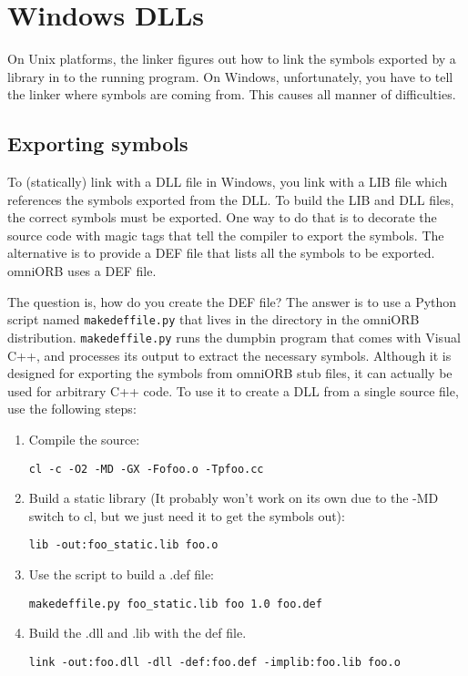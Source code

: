 \documentclass[11pt,twoside,a4paper]{book}
\newcommand{\cmdline}[1]{\texttt{#1}}
\newcommand{\file}{\begingroup \urlstyle{tt}\Url}
\begin{document}
\section{Windows DLLs}

On Unix platforms, the linker figures out how to link the symbols
exported by a library in to the running program. On Windows,
unfortunately, you have to tell the linker where symbols are coming
from. This causes all manner of difficulties.

\subsection{Exporting symbols}

To (statically) link with a DLL file in Windows, you link with a LIB
file which references the symbols exported from the DLL. To build the
LIB and DLL files, the correct symbols must be exported. One way to do
that is to decorate the source code with magic tags that tell the
compiler to export the symbols. The alternative is to provide a DEF
file that lists all the symbols to be exported. omniORB uses a DEF
file.

The question is, how do you create the DEF file?  The answer is to use
a Python script named \cmdline{makedeffile.py} that lives in the
\file{bin\scripts} directory in the omniORB distribution.
\cmdline{makedeffile.py} runs the dumpbin program that comes with
Visual C++, and processes its output to extract the necessary symbols.
Although it is designed for exporting the symbols from omniORB stub
files, it can actually be used for arbitrary C++ code. To use it to
create a DLL from a single source file, use the following steps:

\begin{enumerate}
\item Compile the source:

  \cmdline{cl -c -O2 -MD -GX -Fofoo.o -Tpfoo.cc}

\item Build a static library (It probably won't work on its own due to
      the -MD switch to cl, but we just need it to get the symbols
      out):

  \cmdline{lib -out:foo\_static.lib foo.o}

\item Use the script to build a .def file:

  \cmdline{makedeffile.py foo\_static.lib foo 1.0 foo.def}

\item Build the .dll and .lib with the def file.

  \cmdline{link -out:foo.dll -dll -def:foo.def -implib:foo.lib foo.o}
\end{enumerate}
\end{document}
